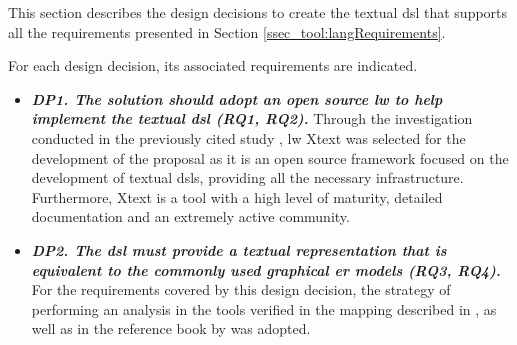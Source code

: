This section describes the design decisions to create the textual \ac{dsl} that supports all the requirements presented in Section \ref{ssec_tool:langRequirements}.

For each design decision, its associated requirements are indicated.


\begin{itemize}
    \item\textit{\textbf{DP1. The solution should adopt an open source \ac{lw} to help implement the textual \ac{dsl} (RQ1, RQ2).}}
     Through the investigation conducted in the previously cited study \cite{Lopes:2019}, \ac{lw} Xtext was selected for the development of the proposal as it is an open source framework focused on the development of textual \acp{dsl}, providing all the necessary infrastructure.
     Furthermore, Xtext is a tool with a high level of maturity, detailed documentation and an extremely active community.
    
    \item\textit{\textbf{DP2. The \ac{dsl} must provide a textual representation that is equivalent to the commonly used graphical \ac{er} models (RQ3, RQ4).}}
    For the requirements covered by this design decision, the strategy of performing an analysis in the tools verified in the mapping described in \cite{Lopes:2019}, as well as in the reference book by \cite{Heuser:2009} was adopted.
    

\end{itemize}
